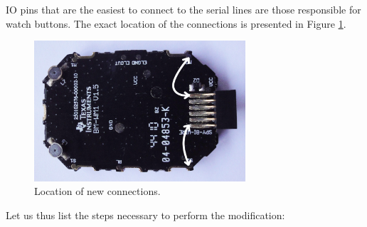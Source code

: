 IO pins that are the easiest to connect to the serial lines are those
responsible for watch buttons. The exact location of the connections
is presented in Figure \ref{fig:chronos_where_to_connect}.
\begin{figure}[h]
  \centering
  \includegraphics[width=0.7\textwidth]{img/chronos_where_to_connect.jpg}
  \caption{Location of new connections.}
  \label{fig:chronos_where_to_connect}
\end{figure}
Let us thus list the steps necessary to perform the modification:
